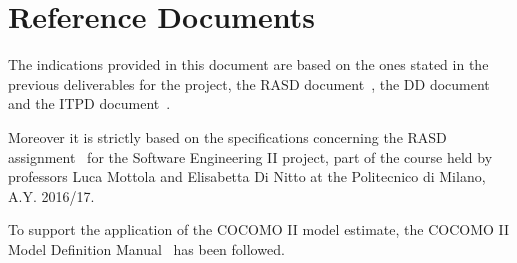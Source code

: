 \section{Reference Documents}
The indications provided in this document are based on the ones stated in the previous deliverables for the project, the RASD document~\cite{rasd}, the DD document~\cite{dd} and the ITPD document~\cite{itpd}.

Moreover it is strictly based on the specifications concerning the RASD assignment~\cite{se-assignments} for the Software Engineering II project, part of the course held by professors Luca Mottola and Elisabetta Di Nitto at the Politecnico di Milano, A.Y. 2016/17.

To support the application of the COCOMO II model estimate, the COCOMO II Model Definition Manual~\cite{cocomo-manual} has been followed.